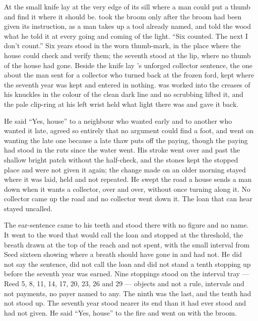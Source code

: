 At  the small knife lay at the very edge of its sill where a man could put a thumb and find it where it should be.  took the broom only after the broom had been given its instruction, as a man takes up a tool already named, and told the wood what he told it at every going and coming of the light. “Six counted. The next I don't count.” Six years stood in the worn thumb-mark, in the place where the house could check and verify them; the seventh stood at the lip, where no thumb of the house had gone. Beside the knife lay 's unforged collector sentence, the one about the man sent for a collector who turned back at the frozen ford, kept where the seventh year was kept and entered in nothing.  was worked into the creases of his knuckles in the colour of the clean dark line and no scrubbing lifted it, and the pale clip-ring at his left wrist held what light there was and gave it back.

He said “Yes, house” to a neighbour who wanted  early and to another who wanted it late, agreed so entirely that no argument could find a foot, and went on wanting the late one because a late thaw puts off the paying, though the paying had stood in the ruts since the water went. His stroke went over  and past the shallow bright patch without the half-check, and the stones kept the stopped place and were not given it again; the change made on an older morning stayed where it was laid, held and not repeated. He swept the road a house sends a man down when it wants a collector, over and over, without once turning along it. No collector came up the road and no collector went down it. The loan that can hear stayed uncalled.

The ear-sentence came to his teeth and stood there with no figure and no name. It went to the word that would call the loan and stopped at the threshold, the breath drawn at the top of the reach and not spent, with the small interval from Seed sixteen showing where a breath should have gone in and had not. He did not say the sentence, did not call the loan and did not stand a tenth stopping up before the seventh year was earned. Nine stoppings stood on the interval tray --- Reed 5, 8, 11, 14, 17, 20, 23, 26 and 29 --- objects and not a rule, intervals and not payments, no payer named to any. The ninth was the last, and the tenth had not stood up. The seventh year stood nearer its end than it had ever stood and had not given. He said “Yes, house” to the fire and went on with the broom.

